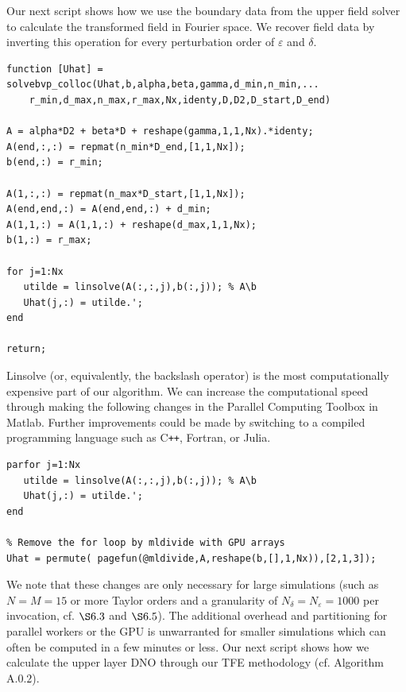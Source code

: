 Our next script shows how we use the boundary data from the upper field solver to calculate the transformed field in Fourier space. We recover field data by inverting this operation for every perturbation order of $\varepsilon$ and $\delta$.

\begin{lstlisting}[caption={BVP Solver for the Chebyshev Collocation Method},frame=single]
function [Uhat] = solvebvp_colloc(Uhat,b,alpha,beta,gamma,d_min,n_min,...
    r_min,d_max,n_max,r_max,Nx,identy,D,D2,D_start,D_end)

A = alpha*D2 + beta*D + reshape(gamma,1,1,Nx).*identy;
A(end,:,:) = repmat(n_min*D_end,[1,1,Nx]);
b(end,:) = r_min;
      
A(1,:,:) = repmat(n_max*D_start,[1,1,Nx]);
A(end,end,:) = A(end,end,:) + d_min;
A(1,1,:) = A(1,1,:) + reshape(d_max,1,1,Nx);
b(1,:) = r_max;

for j=1:Nx
   utilde = linsolve(A(:,:,j),b(:,j)); % A\b
   Uhat(j,:) = utilde.';
end

return;
\end{lstlisting}
Linsolve (or, equivalently, the backslash operator) is the most computationally expensive part of our algorithm. We can increase the computational speed through making the following changes in the Parallel Computing Toolbox in Matlab. Further improvements could be made by switching to a compiled programming language such as C\texttt{++}, Fortran, or Julia.
\begin{lstlisting}[caption={Parallel Version of the BVP Solver for the Chebyshev Collocation Method},frame=single]
% Execute for-loop iterations in parallel on workers
parfor j=1:Nx
   utilde = linsolve(A(:,:,j),b(:,j)); % A\b
   Uhat(j,:) = utilde.';
end

% Remove the for loop by mldivide with GPU arrays
Uhat = permute( pagefun(@mldivide,A,reshape(b,[],1,Nx)),[2,1,3]);
\end{lstlisting}
We note that these changes are only necessary for large simulations (such as $N=M=15$ or more Taylor orders and a granularity of $N_{\delta}=N_{\varepsilon}=1000$ per invocation, cf. $\S 6.3$ and $\S 6.5$). The additional overhead and partitioning for parallel workers or the GPU is unwarranted for smaller simulations which can often be computed in a few minutes or less. Our next script shows how we calculate the upper layer DNO through our TFE methodology (cf. Algorithm $\text{A}.0.2$).
